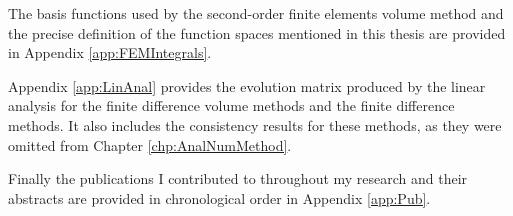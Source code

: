 The basis functions used by the second-order finite elements volume method and the precise definition of the function spaces mentioned in this thesis are provided in Appendix \ref{app:FEMIntegrals}. 

Appendix \ref{app:LinAnal} provides the evolution matrix produced by the linear analysis for the finite difference volume methods and the finite difference methods. It also includes the consistency results for these methods, as they were omitted from Chapter \ref{chp:AnalNumMethod}.  

Finally the publications I contributed to throughout my research and their abstracts are provided in chronological order in Appendix \ref{app:Pub}. 